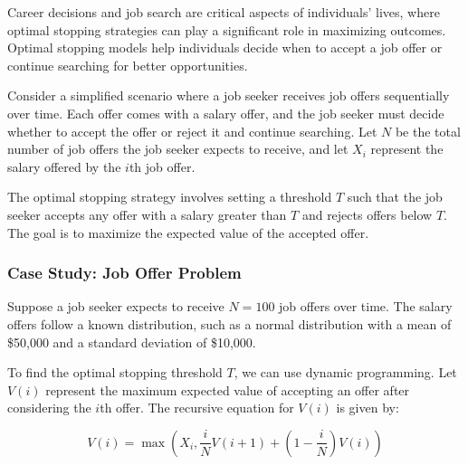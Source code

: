 \documentclass[12pt]{book} %
\begin{document}
Career decisions and job search are critical aspects of individuals' lives, where optimal stopping strategies can play a significant role in maximizing outcomes. Optimal stopping models help individuals decide when to accept a job offer or continue searching for better opportunities.

Consider a simplified scenario where a job seeker receives job offers sequentially over time. Each offer comes with a salary offer, and the job seeker must decide whether to accept the offer or reject it and continue searching. Let \(N\) be the total number of job offers the job seeker expects to receive, and let \(X_i\) represent the salary offered by the \(i\)th job offer.

The optimal stopping strategy involves setting a threshold \(T\) such that the job seeker accepts any offer with a salary greater than \(T\) and rejects offers below \(T\). The goal is to maximize the expected value of the accepted offer.

\subsubsection{Case Study: Job Offer Problem}

Suppose a job seeker expects to receive \(N = 100\) job offers over time. The salary offers follow a known distribution, such as a normal distribution with a mean of \$50,000 and a standard deviation of \$10,000.

To find the optimal stopping threshold \(T\), we can use dynamic programming. Let \(V(i)\) represent the maximum expected value of accepting an offer after considering the \(i\)th offer. The recursive equation for \(V(i)\) is given by:

\[
V(i) = \max\left(X_i, \frac{i}{N}V(i+1) + \left(1 - \frac{i}{N}\right)V(i)\right)
\]
\end{document}
